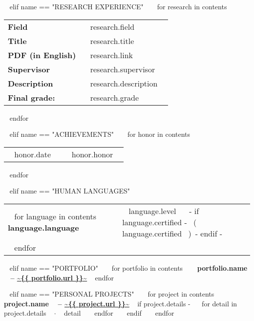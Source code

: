\begin{minipage}{\textwidth}
~{ elif name == "RESEARCH EXPERIENCE" }~
  ~{ for research in contents }~
    \begin{tabular}{ @{} p{32mm} p{135mm} @{} }

    \small \bf Field & \small ~{{ research.field }}~ \\
    \small \bf Title & \small ~{{ research.title }}~ \\
    \small \bf PDF (in English) & \small ~{{ research.link }}~ \\
    \small \bf Supervisor & \small ~{{ research.supervisor }}~ \\
    \small \bf Description & \small ~{{ research.description }}~ \\
    \small \bf \small \color{maingrey} Final grade: & \small \color{maingrey} ~{{ research.grade }}~ \\
    
    \end{tabular}
    \vspace{1mm}
  ~{ endfor }~
  \vspace{4mm}

~{ elif name == "ACHIEVEMENTS" }~
  ~{ for honor in contents }~
    \begin{tabular}{ @{} p{32mm} p{135mm} @{} }
    {~{{ honor.date }}~} & {\small ~{{ honor.honor }}~}
    \end{tabular}
    \vspace{1mm}
  ~{ endfor }~

~{ elif name == "HUMAN LANGUAGES" }~
  \begin{tabular}{ @{} p{32mm} p{135mm} @{} }
  ~{ for language in contents }~
    \bf {~{{ language.language }}~} & {\small ~{{ language.level }}~ ~{- if language.certified -}~ \small\color{maingrey}\hspace{1mm}(~{{ language.certified }}~)~{- endif -}~} \\
  ~{ endfor }~
  \end{tabular}
  \vspace{2mm}

~{ elif name == "PORTFOLIO" }~
  ~{ for portfolio in contents }~
    {\bf ~{{ portfolio.name }}~ -- \color{maincolor}\url{~{{ portfolio.url }}~} }
    \vspace{1mm}
  ~{ endfor }~

~{ elif name == "PERSONAL PROJECTS" }~
  ~{ for project in contents }~
    {\small\bf ~{{ project.name }}~ -- \color{maincolor}\url{~{{ project.url }}~} }
    \vspace{1mm}
    ~{ if project.details -}~
    ~{ for detail in project.details }~
      $\cdot$ \small ~{{ detail }}~
    ~{ endfor }~
    ~{ endif }~
    \vspace{3mm}
  ~{ endfor }~
  \vspace{15mm}


\end{minipage}
